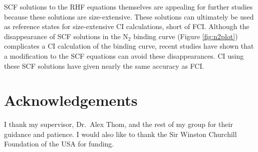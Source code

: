 \documentclass[final,3p,times,twocolumn]{elsarticle}
\begin{document}


SCF solutions to the RHF equations themselves are appealing for further studies because these solutions are size-extensive. These solutions can ultimately be used as reference states for size-extensive CI calculations, short of FCI.\cite{thom-2009} Although the disappearance of SCF solutions in the N$_2$ binding curve (Figure \ref{fig:n2plot}) complicates a CI calculation of the binding curve, recent studies have shown that a modification to the SCF equations can avoid these disappearances.\cite{thom-2014} CI using these SCF solutions have given nearly the same accuracy as FCI.\cite{thom-2016} %


\section*{Acknowledgements}
I thank my supervisor, Dr.\ Alex Thom, and the rest of my group for their guidance and patience. I would also like to thank the Sir Winston Churchill Foundation of the USA for funding.















\end{document}
